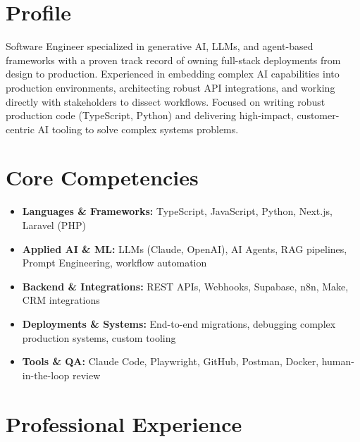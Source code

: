 \documentclass[11pt,a4paper,sans]{moderncv}
\begin{document}
\makecvtitle

\section{Profile}
Software Engineer specialized in generative AI, LLMs, and agent-based frameworks with a proven track record of owning full-stack deployments from design to production. Experienced in embedding complex AI capabilities into production environments, architecting robust API integrations, and working directly with stakeholders to dissect workflows. Focused on writing robust production code (TypeScript, Python) and delivering high-impact, customer-centric AI tooling to solve complex systems problems.

\section{Core Competencies}
\begin{itemize}
\item \textbf{Languages \& Frameworks:} TypeScript, JavaScript, Python, Next.js, Laravel (PHP)
\item \textbf{Applied AI \& ML:} LLMs (Claude, OpenAI), AI Agents, RAG pipelines, Prompt Engineering, workflow automation
\item \textbf{Backend \& Integrations:} REST APIs, Webhooks, Supabase, n8n, Make, CRM integrations
\item \textbf{Deployments \& Systems:} End-to-end migrations, debugging complex production systems, custom tooling
\item \textbf{Tools \& QA:} Claude Code, Playwright, GitHub, Postman, Docker, human-in-the-loop review
\end{itemize}

\section{Professional Experience}

\end{document}
